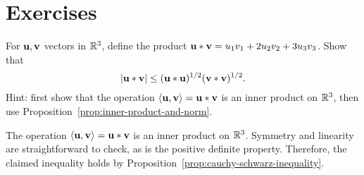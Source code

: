 \section*{Exercises}

\begin{ex}
  For $\vect{u},\vect{v}$ vectors in $\mathbb{R}^{3}$, define the product
  $\vect{u}\ast \vect{v} = u_{1}v_{1}+2u_{2}v_{2}+3u_{3}v_{3}$. Show
  that 
  \begin{equation*}
    \abs{\vect{u}\ast \vect{v}} \leq (\vect{u}\ast \vect{u})
    ^{1/2}(\vect{v}\ast \vect{v}) ^{1/2}.
  \end{equation*}
  Hint: first show that the operation
  $\iprod{\vect{u},\vect{v}}=\vect{u}\ast\vect{v}$ is an inner product
  on $\mathbb{R}^{3}$, then use Proposition~\ref{prop:inner-product-and-norm}.
  \begin{sol}
    The operation $\iprod{\vect{u},\vect{v}}=\vect{u}\ast\vect{v}$ is
    an inner product on $\mathbb{R}^{3}$. Symmetry and linearity are
    straightforward to check, as is the positive definite
    property. Therefore, the claimed inequality holds by
    Proposition~\ref{prop:cauchy-schwarz-inequality}.
  \end{sol}
\end{ex}

